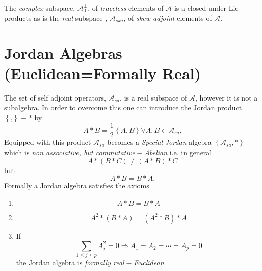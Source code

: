 \documentclass[aps, preprint]{revtex4}
\begin{document}
The \emph{complex} subspace, $\mathcal{A}_{0}^{\bot }\text{,}$ of \emph{traceless} elements of $\mathcal{A}$ is a closed under Lie products as is the \emph{real }subspace , $\mathcal{A}_{s k a}\text{,}$ of \emph{skew adjoint} elements of $\mathcal{A}\text{.}$ 

\section{Jordan Algebras (Euclidean=Formally Real)}
The set of self adjoint operators, $\mathcal{A}_{s a}\text{,}$ is a real subspace of $\mathcal{A}\text{,}$ however it is not a subalgebra. In order to overcome this one can introduce the Jordan product $\left \{\text{,}\right \} \equiv  \ast $ by
\begin{equation}A \ast B =\frac{1}{2} \left \{A ,B\right \}\text{} \forall A ,B \in \mathcal{A}_{s a}\text{.}
\end{equation}Equipped with this product $\mathcal{A}_{s a}$ becomes a \emph{Special} \emph{Jordan} algebra $\left \{\mathcal{A}_{s a} , \ast \right \}$ which is \emph{non associative, but commutative}$ \equiv $\emph{Abelian }i.e. in general
\begin{equation}A \ast \left (B \ast C\right ) \neq \left (A \ast B\right ) \ast C
\end{equation}but
\begin{equation}A \ast B =B \ast A\text{.}
\end{equation}Formally a Jordan algebra satisfies the axioms 


\begin{enumerate}
\item
\begin{equation}A \ast B =B \ast A
\end{equation}

\item
\begin{equation}A^{2} \ast \left (B \ast A\right ) =\left (A^{2} \ast B\right ) \ast A
\end{equation}

\item If
\begin{equation}\sum _{1 \leq j \leq p}A_{j}^{2} =0 \Rightarrow A_{1} =A_{2} =\cdots  =A_{p} =0
\end{equation}the Jordan algebra is \emph{formally real}$ \equiv $\emph{Euclidean}. \end{enumerate}
\end{document}
